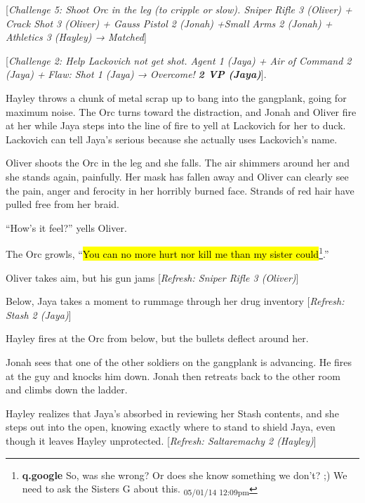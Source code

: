 {[}\textit{Challenge 5: Shoot Orc in the leg (to cripple or slow).  Sniper Rifle 3 (Oliver) + Crack Shot 3 (Oliver) + Gauss Pistol 2 (Jonah) +Small Arms 2 (Jonah) + Athletics 3 (Hayley)  → Matched}{]}



{[}\textit{Challenge 2: Help Lackovich not get shot.  Agent 1  (Jaya) + Air of Command 2  (Jaya) + }\textit{ {\color[RGB]{255,0,0}Flaw: Shot 1 (Jaya)} }\textit{  → Overcome! }\textit{\textbf{2 VP (Jaya)}}{]}.



Hayley throws a chunk of metal scrap up to bang into the gangplank, going for maximum noise.  The Orc turns toward the distraction, and Jonah and Oliver fire at her while Jaya steps into the line of fire to yell at Lackovich for her to duck.  Lackovich can tell Jaya's serious because she actually uses Lackovich's name. 



Oliver shoots the Orc in the leg and she falls.  The air shimmers around her and she stands again, painfully.  Her mask has fallen away and Oliver can clearly see the pain, anger and ferocity in her horribly burned face.  Strands of red hair have pulled free from her braid.



``How's it feel?'' yells Oliver.



The Orc growls, ``\hl{You can no more hurt nor kill me than my sister could}\footnote{\textbf{q.google }So, was she wrong?  Or does she know something we don't? ;)
We need to ask the Sisters G about this. \textsubscript{05/01/14 12:09pm}}.''



Oliver takes aim, but his gun jams {[}\textit{Refresh: Sniper Rifle 3 (Oliver)}{]}



Below, Jaya takes a moment to rummage through her drug inventory {[}\textit{Refresh: Stash 2 (Jaya)}{]}



Hayley fires at the Orc from below, but the bullets deflect around her.



Jonah sees that one of the other soldiers on the gangplank is advancing.  He fires at the guy and knocks him down.  Jonah then retreats back to the other room and climbs down the ladder.



Hayley realizes that Jaya's absorbed in reviewing her Stash contents, and she steps out into the open, knowing exactly where to stand to shield Jaya, even though it leaves Hayley unprotected.  {[}\textit{Refresh: Saltaremachy 2 (Hayley)}{]}



